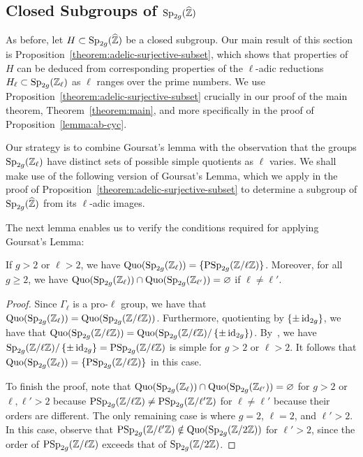\subsection{Closed Subgroups of $\operatorname{Sp}_{2g}(\widehat{\mathbb Z})$}
\label{subsection:closed-subgroups}
	
	As before, let $H \subset \operatorname{Sp}_{2g}(\widehat{{\mathbb Z}})$ be a closed subgroup. Our main result of this section is Proposition~\ref{theorem:adelic-surjective-subset}, which shows that properties of $H$ can be deduced from corresponding properties of the $\ell$-adic reductions $H_\ell \subset \operatorname{Sp}_{2g}({\mathbb Z}_\ell)$ as $\ell$ ranges over the prime numbers.
	We use Proposition~\ref{theorem:adelic-surjective-subset} crucially in our proof of the main theorem, Theorem~\ref{theorem:main},
	and more specifically in the proof of Proposition~\ref{lemma:ab-cyc}.

	Our strategy is to combine Goursat's lemma with the observation that the groups $\operatorname{Sp}_{2g}({\mathbb Z}_\ell)$ have distinct sets of possible simple quotients as $\ell$ varies. We shall make use of the following version of Goursat's Lemma, which we apply in the proof of Proposition~\ref{theorem:adelic-surjective-subset} to determine a subgroup of $\operatorname{Sp}_{2g}(\widehat{\mathbb Z})$ from its $\ell$-adic images.

	The next lemma enables us to verify the conditions required for applying Goursat's
	Lemma:\vspace*{-0.2in}
	\begin{lemma}
		\label{lemma:simple-quotients-of-symplectic-group}
       If $g > 2$ or $\ell > 2$, we have $\operatorname{Quo}(\operatorname{Sp}_{2g}(\mathbb Z_\ell)) = \{\operatorname{PSp}_{2g}(\mathbb Z/ \ell \mathbb Z)\}$. Moreover, for all $g \geq 2$, we have $\operatorname{Quo}(\operatorname{Sp}_{2g}(\mathbb Z_\ell)) \cap \operatorname{Quo}(\operatorname{Sp}_{2g}(\mathbb Z_{\ell'})) = \varnothing$ if $\ell \neq \ell'$.
	\end{lemma}
	\begin{proof}
		Since $\Gamma_\ell$ is a pro-$\ell$ group, we have that
		$\operatorname{Quo} (\operatorname{Sp}_{2g}(\mathbb Z_\ell)) = \operatorname{Quo}(\operatorname{Sp}_{2g}(\mathbb Z/ \ell \mathbb Z))$.
		Furthermore, quotienting by $\{\pm \operatorname{id}_{2g}\}$, we have that
		$\operatorname{Quo}(\operatorname{Sp}_{2g}(\mathbb Z/ \ell \mathbb Z)) = \operatorname{Quo}(\operatorname{Sp}_{2g}(\mathbb Z/ \ell \mathbb Z)/\left\{ \pm \operatorname{id}_{2g} \right\})$. By~\cite[Theorem 3.4.1]{omeara1978symplectic}, we have $\operatorname{Sp}_{2g}(\mathbb Z/\ell \mathbb Z)/\left\{ \pm \operatorname{id}_{2g} \right\} = \operatorname{PSp}_{2g}(\mathbb Z/ \ell \mathbb Z)$ is simple for $g > 2$ or $\ell > 2$. It follows that $\operatorname{Quo}(\operatorname{Sp}_{2g}(\mathbb Z_\ell)) = \{\operatorname{PSp}_{2g}(\mathbb Z/ \ell \mathbb Z)\}$ in this case.

To finish the proof, note that $\operatorname{Quo}(\operatorname{Sp}_{2g}(\mathbb Z_\ell)) \cap \operatorname{Quo}(\operatorname{Sp}_{2g}(\mathbb Z_{\ell'})) = \varnothing$ for $g > 2$ or $\ell, \ell' > 2$ because $\operatorname{PSp}_{2g}({\mathbb Z} / \ell {\mathbb Z}) \neq \operatorname{PSp}_{2g}({\mathbb Z} / \ell' {\mathbb Z})$ for $\ell \neq \ell'$ because their orders are different. The only remaining case is where $g = 2$, $\ell = 2$, and $\ell' > 2$. In this case, observe that $\operatorname{PSp}_{2g}({\mathbb Z} / \ell' \mathbb Z) \notin \operatorname{Quo}( \operatorname{Sp}_{2g}({\mathbb Z} / 2 \mathbb Z))$ for $\ell' > 2$, since the order of $\operatorname{PSp}_{2g}({\mathbb Z} / \ell \mathbb Z)$ exceeds that of $\operatorname{Sp}_{2g}({\mathbb Z} / 2 \mathbb Z)$.
	\end{proof}
	
